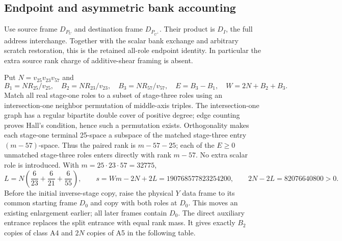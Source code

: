\subsection{Endpoint and asymmetric bank accounting}
Use source frame $D_{P_U}$ and destination frame $D_{P_{U^\perp}}$.
Their product is $D_I$, the full address interchange. Together with the
scalar bank exchange and arbitrary scratch restoration, this is the
retained all-role endpoint identity. In particular the extra source
rank charge of additive-shear framing is absent.

Put $N=v_{25}v_{23}v_{57}$ and
\[
 B_1=N R_{25}/v_{25},\quad B_2=N R_{23}/v_{23},\quad
 B_3=N R_{57}/v_{57},\quad E=B_3-B_1,\quad
 W=2N+B_2+B_3.
\]
Match all real stage-one roles to a subset of stage-three roles using
an intersection-one neighbor permutation of middle-axis triples.
The intersection-one graph has a regular bipartite double cover of
positive degree; edge counting proves Hall's condition, hence such a
permutation exists. Orthogonality makes each stage-one terminal
25-space a subspace of the matched stage-three entry $(m-57)$-space.
Thus the paired rank is $m-57-25$; each of the $E\ge0$ unmatched
stage-three roles enters directly with rank $m-57$. No extra scalar
role is introduced. With $m=25\cdot23\cdot57=32775$,
\[
 L=N\left(\frac6{23}+\frac6{21}+\frac6{55}\right),\qquad
 s=Wm-2N+2L=190768577823254200,
 \qquad 2N-2L=82076640800>0.
\]
Before the initial inverse-stage copy, raise the physical $Y$ data
frame to its common starting frame $D_0$ and copy with both roles at
$D_0$. This moves an existing enlargement earlier; all later frames
contain $D_0$. The direct auxiliary entrance replaces the split entrance
with equal rank mass. It gives exactly $B_2$ copies of class A4 and
$2N$ copies of A5 in the following table.
